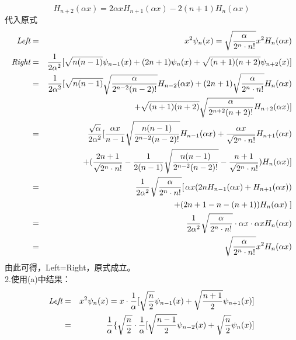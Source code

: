 \documentclass[a4paper]{article}
\begin{document}
\begin{CJK*}{UTF8}{song}
{    $$H_{n+2}(\alpha x) = 2\alpha x H_{n+1}(\alpha x) - 2(n+1)H_{n}(\alpha x)$$
    代入原式
    \begin{eqnarray}
        \emph{Left}    & = & x^{2}\psi_{n}(x)=\sqrt{\frac{\alpha}{2^{n}\cdot n!}}x^{2} H_{n}(\alpha x)\nonumber\\
        \emph{Right}   & = & \frac{1}{2\alpha^{2}}[\sqrt{n(n-1)}\psi_{n-1}(x)+(2 n + 1)\psi_{n}(x) + \sqrt{(n+1)(n+2)}\psi_{n+2}(x)]\nonumber\\
            & = & \frac{1}{2\alpha^{2}}[\sqrt{n(n-1)}\sqrt{\frac{\alpha}{2^{n-2}(n-2)!}}H_{n-2}(\alpha x)
                +(2 n + 1)\sqrt{\frac{\alpha}{2^{n}\cdot n!}}H_{n}(\alpha x) \nonumber\\
            &   & + \sqrt{(n+1)(n+2)}\sqrt{\frac{\alpha}{2^{n+2}(n+2)!}}H_{n+2}(\alpha x)]\nonumber\\
            & = & \frac{\sqrt{\alpha}}{2\alpha^{2}}[
                \frac{\alpha x}{n-1}\sqrt{\frac{n(n-1)}{2^{n-2}(n-2)!}}H_{n-1}(\alpha x)
                + \frac{\alpha x}{\sqrt{2^{n}\cdot n!}}H_{n+1}(\alpha x)\nonumber\\
            &   & +(\frac{2n+1}{\sqrt{2^{n}\cdot n!}} - \frac{1}{2(n-1)}\sqrt{\frac{n(n-1)}{2^{n-2}(n-2)!}}
                - \frac{n+1}{\sqrt{2^{n}\cdot n!}})H_{n}(\alpha x)]\nonumber\\
            & = & \frac{1}{2\alpha^{2}}\sqrt{\frac{\alpha}{2^{n}\cdot n!}} \mbox{$\left[\right.$}
                \alpha x (2 n H_{n-1}(\alpha x) + H_{n+1}(\alpha x))\nonumber\\
            &   & \mbox{$+(2n+1-n-(n+1))H_{n}(\alpha x)\left.\right]$}\nonumber\\
            & = & \frac{1}{2\alpha^{2}}\sqrt{\frac{\alpha}{2^{n}\cdot n!}}\cdot\alpha x\cdot \alpha x H_{n}(\alpha x)\nonumber\\
            & = & \sqrt{\frac{\alpha}{2^{n}\cdot n!}}x^{2} H_{n}(\alpha x)\nonumber
    \end{eqnarray}
    由此可得，Left=Right，原式成立。\\[8pt]
    2.使用(a)中结果：
    \begin{eqnarray}
        \emph{Left}    & = & x^{2}\psi_{n}(x)
                    = x\cdot \frac{1}{\alpha}[\sqrt{\frac{n}{2}}\psi_{n-1}(x) + \sqrt{\frac{n + 1}{2}}\psi_{n+1}(x)]\nonumber\\
                & = & \frac{1}{\alpha}\{\sqrt{\frac{n}{2}}\cdot
                    \frac{1}{\alpha}[\sqrt{\frac{n-1}{2}}\psi_{n-2}(x) + \sqrt{\frac{n}{2}}\psi_{n}(x)]\nonumber\\

\end{eqnarray}}
\end{CJK*}
\end{document}
